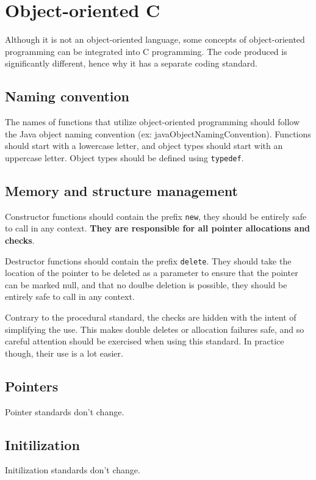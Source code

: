 \documentclass{article}
\begin{document}
\pagebreak

\section{Object-oriented C}
Although it is not an object-oriented language, some concepts of object-oriented programming can be integrated into C programming. The code produced is significantly different, hence why it has a separate coding standard.

\subsection{Naming convention}
The names of functions that utilize object-oriented programming should follow the Java object naming convention (ex: javaObjectNamingConvention). Functions should start with a lowercase letter, and object types should start with an uppercase letter. Object types should be defined using \texttt{typedef}.


\subsection{Memory and structure management}
Constructor functions should contain the prefix \texttt{new}, they should be entirely safe to call in any context. \textbf{They are responsible for all pointer allocations and checks}.

Destructor functions should contain the prefix \texttt{delete}. They should take the location of the pointer to be deleted as a parameter to ensure that the pointer can be marked null, and that no doulbe deletion is possible, they should be entirely safe to call in any context.

Contrary to the procedural standard, the checks are hidden with the intent of simplifying the use. This makes double deletes or allocation failures safe, and so careful attention should be exercised when using this standard. In practice though, their use is a lot easier.

\subsection{Pointers}
Pointer standards don't change.

\subsection{Initilization}
Initilization standards don't change.
\end{document}
